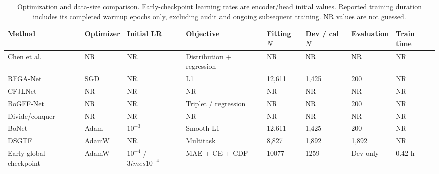 \begin{table}[!t]
\centering\footnotesize
\caption{Optimization and data-size comparison. Early-checkpoint learning rates are encoder/head initial values. Reported training duration includes its completed warmup epochs only, excluding audit and ongoing subsequent training. NR values are not guessed.}
\label{tab:prelim_sota_optimization}
\begin{tabularx}{\textwidth}{@{}p{28mm}XXXXXXX@{}}
\toprule
Method & Optimizer & Initial LR & Objective & Fitting $N$ & Dev / cal $N$ & Evaluation & Train time \\
\midrule
Chen et al.~\cite{chen} & NR & NR & Distribution + regression & NR & NR & NR & NR \\
RFGA-Net~\cite{rfga} & SGD & NR & L1 & 12,611 & 1,425 & 200 & NR \\
CFJLNet~\cite{cfjl} & NR & NR & NR & NR & NR & NR & NR \\
BoGFF-Net~\cite{bogff} & NR & NR & Triplet / regression & NR & NR & 200 & NR \\
Divide/conquer~\cite{lightweight} & NR & NR & NR & NR & NR & NR & NR \\
BoNet+~\cite{bonetplus} & Adam & $10^{-3}$ & Smooth L1 & 12,611 & 1,425 & 200 & NR \\
DSGTF~\cite{stage} & AdamW & NR & Multitask & 8,827 & 1,892 & 1,892 & NR \\
Early global checkpoint & AdamW & $10^{-4}$ / $3	imes10^{-4}$ & MAE + CE + CDF & 10077 & 1259 & Dev only & 0.42 h \\
\bottomrule
\end{tabularx}
\end{table}